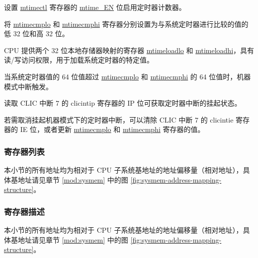 \documentclass[main\_\_CN.tex]{subfiles}
\begin{document}
设置 \hyperref[regdesc:CLINTMTIMECTLREG]{mtimectl} 寄存器的 \hyperref[fielddesc:CLINTMTIMECTLEN]{mtime\_EN} 位启用定时器计数器。

将 \hyperref[regdesc:CLINTMTIMECMPLOREG]{mtimecmplo} 和 \hyperref[regdesc:CLINTMTIMECMPHIREG]{mtimecmphi} 寄存器分别设置为与系统定时器进行比较的值的低 32 位和高 32 位。

CPU 提供两个 32 位本地存储器映射的寄存器 \hyperref[regdesc:CLINTMTIMELOADLOREG]{mtimeloadlo} 和 \hyperref[regdesc:CLINTMTIMELOADHIREG]{mtimeloadhi}，具有读/写访问权限，用于加载系统定时器的特定值。

当系统定时器值的 64 位值超过 \hyperref[regdesc:CLINTMTIMECMPLOREG]{mtimecmplo} 和 \hyperref[regdesc:CLINTMTIMECMPHIREG]{mtimecmphi} 的 64 位值时，机器模式中断触发。

读取 CLIC 中断 7 的 clicintip 寄存器的 IP 位可获取定时器中断的挂起状态。

若需取消挂起机器模式下的定时器中断，可以清除 CLIC 中断 7 的 clicintie 寄存器的 IE 位，或者更新 \hyperref[regdesc:CLINTMTIMECMPLOREG]{mtimecmplo} 和 \hyperref[regdesc:CLINTMTIMECMPHIREG]{mtimecmphi} 寄存器的值。


\hypertarget{riscvcpu-clint-reg-summ}{}
\subsubsection{寄存器列表}
\label{sec:riscvcpu-clint-reg-summ}

本小节的所有地址均为相对于 CPU 子系统基地址的地址偏移量（相对地址），具体基地址请见章节 \ref{mod:sysmem} \textit{} 中的图 \ref{fig:sysmem-address-mapping-structure}。




\subsubsection{寄存器描述}

本小节的所有地址均为相对于 CPU 子系统基地址的地址偏移量（相对地址），具体基地址请见章节 \ref{mod:sysmem} \textit{} 中的图 \ref{fig:sysmem-address-mapping-structure}。



\newpage
\end{document}
